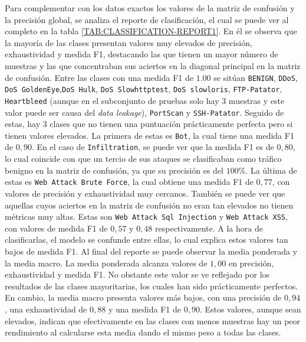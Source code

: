 Para complementar con los datos exactos los valores de la matriz de confusión y la precisión global, se analiza el reporte de clasificación, el cual se puede ver al completo en la tabla \ref{TAB:CLASSIFICATION-REPORT1}. En él se observa que la mayoría de las clases presentan valores muy elevados de precisión, exhaustividad y medida F1, destacando las que tienen un mayor número de muestras y las que concentraban sus aciertos en la diagonal principal en la matriz de confusión. Entre las clases con una medida F1 de $1.00$ se sitúan \texttt{BENIGN}, \texttt{DDoS}, \texttt{DoS GoldenEye},\texttt{DoS Hulk}, \texttt{DoS Slowhttptest}, \texttt{DoS slowloris}, \texttt{FTP-Patator}, \texttt{Heartbleed} (aunque en el subconjunto de pruebas solo hay 3 muestras y este valor puede ser causa del \textit{data leakage}), \texttt{PortScan} y \texttt{SSH-Patator}. Seguido de estas, hay 3 clases que no tienen una puntuación prácticamente perfecta pero si tienen valores elevados. La primera de estas es \texttt{Bot}, la cual tiene una medida F1 de $0,90$. En el caso de \texttt{Infiltration}, se puede ver que la medida F1 es de $0,80$, lo cual coincide con que un tercio de sus ataques se clasificaban como tráfico benigno en la matriz de confusión, ya que su precisión es del $100\%$. La última de estas es \texttt{Web Attack  Brute Force}, la cual obtiene una medida F1 de $0,77$, con valores de precisión y exhaustividad muy cercanos. También se puede ver que aquellas cuyos aciertos en la matriz de confusión no eran tan elevados no tienen métricas muy altas. Estas son \texttt{Web Attack  Sql Injection} y \texttt{Web Attack XSS}, con valores de medida F1 de $0,57$ y $0,48$ respectivamente. A la hora de clasificarlas, el modelo se confunde entre ellas, lo cual explica estos valores tan bajos de medida F1.
Al final del reporte se puede observar la media ponderada y la media macro. La media ponderada alcanza valores de $1,00$ en precisión, exhaustividad y medida F1. No obstante este valor se ve reflejado por los resultados de las clases mayoritarias, los cuales han sido prácticamente perfectos. En cambio, la media macro presenta valores más bajos, con una precisión de $0,94$, una exhaustividad de $0,88$ y una medida F1 de $0,90$. Estos valores, aunque sean elevados, indican que efectivamente en las clases con menos muestras hay un peor rendimiento al calcularse esta media dando el mismo peso a todas las clases.

